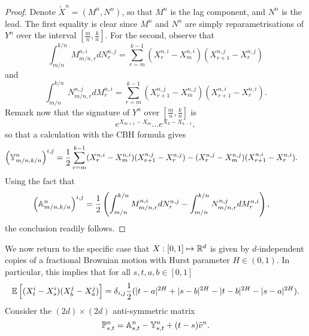 \documentclass{article}
\begin{document}
\begin{proof}
Denote $\tilde X^n = (M^n, N^n)$, so that $M^n$ is the lag component, and $N^n$ is the lead. The first equality is clear since $M^n$ and $N^n$ are simply reparametrisations of $Y^n$ over the interval $[\frac{m}{n},\frac{k}{n}]$. For the second, observe that
\[
\int_{m/n}^{k/n} M^{n,i}_{m/n, r} dN^{n,j}_r = \sum_{r=m}^{k-1} (X^{n,i}_{r}-X^{n,i}_{m}) (X^{n,j}_{r+1} - X^{n,j}_{r})
\]
and
\[
\int_{m/n}^{k/n} N^{n,j}_{m/n, r} dM^{n,i}_r = \sum_{r=m}^{k-1} (X^{n,j}_{r+1}-X^{n,j}_{m}) (X^{n,i}_{r+1} - X^{n,i}_{r}).
\]
Remark now that the signature of $Y^n$ over $[\frac{m}{n},\frac{k}{n}]$ is
\[
e^{X_{m+1} - X_{m}} \ldots e^{X_k - X_{k-1}},
\]
so that a calculation with the CBH formula gives
\begin{align*}
\left(\mathbb Y^n_{m/n,k/n}\right)^{i,j}
&= \frac{1}{2}\sum_{r=m}^{k-1} (X^{n,i}_r-X^{n,i}_m)(X^{n,j}_{r+1}-X^{n,j}_r) - (X^{n,j}_r-X^{n,j}_m)(X^{n,i}_{r+1}-X^{n,i}_r).
\end{align*}
Using the fact that
\begin{align*}
\left(\mathbb A^n_{m/n,k/n}\right)^{i,j} &= \frac{1}{2}\left( \int_{m/n}^{k/n} M^{n,i}_{m/n, r} dN^{n,j}_r - \int_{m/n}^{k/n} N^{n,j}_{m/n, r} dM^{n,i}_r \right),
\end{align*}
the conclusion readily follows.
\end{proof}

We now return to the specific case that $X : [0,1] \mapsto \mathbb R^d$ is given by $d$-independent copies of a fractional Brownian motion with Hurst parameter $H \in (0,1)$. In particular, this implies that for all $s,t,a,b \in [0,1]$
\begin{equation}\label{eq:covariance}
\EEE{(X^i_t-X^i_s)(X^j_b-X^j_a)} = \delta_{i,j} \frac{1}{2}(|t-a|^{2H} + |s-b|^{2H} - |t-b|^{2H} - |s-a|^{2H}).
\end{equation}
Consider the $(2d) \times (2d)$ anti-symmetric matrix
\[
\mathbb P^n_{s,t} = \mathbb A^n_{s,t} - \mathbb Y^n_{s,t} + (t-s)\tilde v^n.
\]
\end{document}
